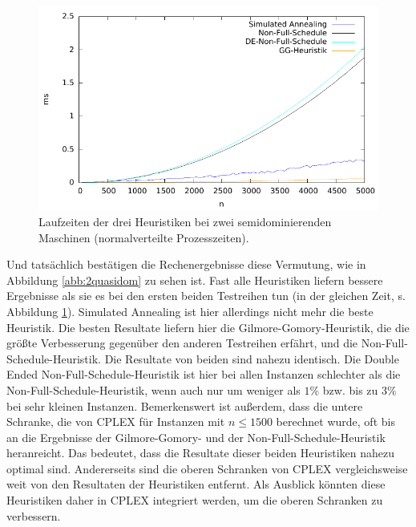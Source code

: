 \documentclass{scrreprt}
\begin{document}
\begin{figure}
    \begin{center}
        \includegraphics[width=.8\textwidth]{../instances/2quasidom/plottime.pdf}
    \end{center}
    \caption{
        \label{abb:2quasidomtime}
        Laufzeiten der drei Heuristiken bei zwei semidominierenden Maschinen (normalverteilte Prozesszeiten).
    }
\end{figure}

Und tatsächlich bestätigen die Rechenergebnisse diese Vermutung, wie in Abbildung \ref{abb:2quasidom} zu sehen ist.
Fast alle Heuristiken liefern bessere Ergebnisse als sie es bei den ersten beiden Testreihen tun (in der gleichen Zeit, s. Abbildung \ref{abb:2quasidomtime}).
Simulated Annealing ist hier allerdings nicht mehr die beste Heuristik.
Die besten Resultate liefern hier die Gilmore-Gomory-Heuristik, die die größte Verbesserung gegenüber den anderen Testreihen erfährt, 
und die Non-Full-Schedule-Heuristik. Die Resultate von beiden sind nahezu identisch.
Die Double Ended Non-Full-Schedule-Heuristik ist hier bei allen Instanzen schlechter als die Non-Full-Schedule-Heuristik, wenn auch nur um weniger als $1\%$
bzw. bis zu $3\%$ bei sehr kleinen Instanzen.
Bemerkenswert ist außerdem, dass die untere Schranke, die von CPLEX für Instanzen mit $n\leq 1500$ berechnet wurde,
oft bis an die Ergebnisse der Gilmore-Gomory- und der Non-Full-Schedule-Heuristik heranreicht.
Das bedeutet, dass die Resultate dieser beiden Heuristiken nahezu optimal sind.
Andererseits sind die oberen Schranken von CPLEX vergleichsweise weit von den Resultaten der Heuristiken entfernt.
Als Ausblick könnten diese Heuristiken daher in CPLEX integriert werden, um die oberen Schranken zu verbessern.



\newpage


\end{document}
